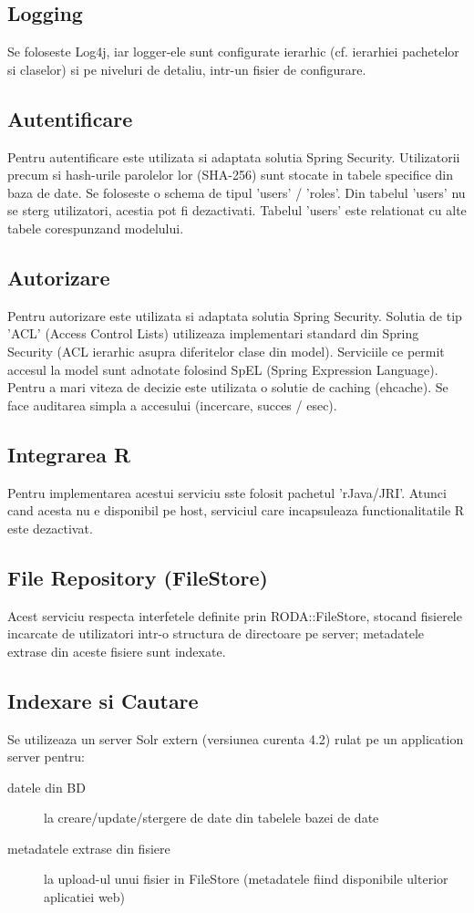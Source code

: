 \subsection{Logging}
Se foloseste Log4j, iar logger-ele sunt configurate ierarhic (cf. ierarhiei
pachetelor si claselor) si pe niveluri de detaliu, intr-un fisier de
configurare.

\subsection{Autentificare}
Pentru autentificare este utilizata si adaptata solutia Spring Security.
Utilizatorii precum si hash-urile parolelor lor (SHA-256) sunt stocate in
tabele specifice din baza de date.
Se foloseste o schema de tipul 'users' / 'roles'.
Din tabelul 'users' nu se sterg utilizatori, acestia pot fi dezactivati.
Tabelul 'users' este relationat cu alte tabele corespunzand modelului.

\subsection{Autorizare}
Pentru autorizare este utilizata si adaptata solutia Spring Security.
Solutia de tip 'ACL' (Access Control Lists) utilizeaza implementari standard din
Spring Security (ACL ierarhic asupra diferitelor clase din model). 
Serviciile ce permit accesul la model sunt adnotate folosind SpEL
(Spring Expression Language).
Pentru a mari viteza de decizie este utilizata o solutie de caching (ehcache). 
Se face auditarea simpla a accesului (incercare, succes / esec). 

\subsection{Integrarea R}
Pentru implementarea acestui serviciu sste folosit pachetul 'rJava/JRI'. 
Atunci cand acesta nu e disponibil pe host, serviciul care
incapsuleaza functionalitatile R este dezactivat.

\subsection{File Repository (FileStore)}
Acest serviciu respecta interfetele definite prin RODA::FileStore, stocand
fisierele incarcate de utilizatori intr-o structura de directoare pe server;
metadatele extrase din aceste fisiere sunt indexate.

\subsection{Indexare si Cautare}
Se utilizeaza un server Solr extern (versiunea curenta 4.2) rulat pe un
application server pentru:
\begin{description}
\item[datele din BD] la creare/update/stergere de date din tabelele bazei de
date
\item[metadatele extrase din fisiere] la upload-ul unui fisier
in FileStore (metadatele fiind disponibile ulterior aplicatiei web)
\end{description}

